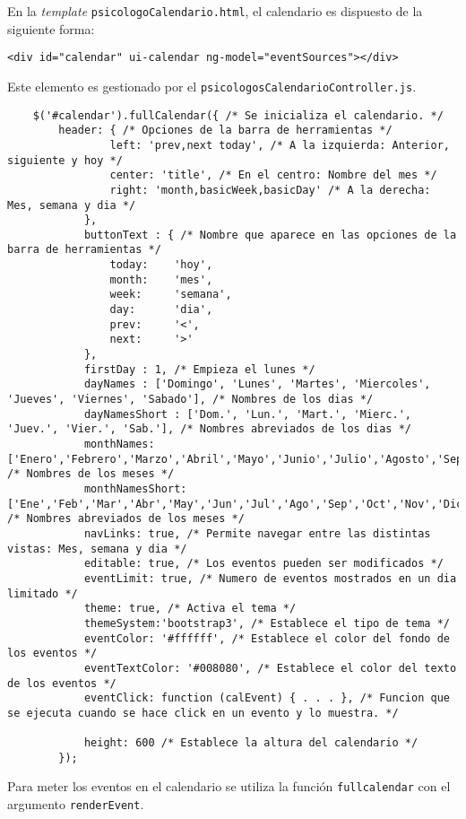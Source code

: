 En la \textit{template} \texttt{psicologoCalendario.html}, el calendario es dispuesto de la siguiente forma:


\medskip
\begin{lstlisting}
<div id="calendar" ui-calendar ng-model="eventSources"></div>
\end{lstlisting}


Este elemento es gestionado por el \texttt{psicologosCalendarioController.js}. 


\medskip
\begin{lstlisting}
	$('#calendar').fullCalendar({ /* Se inicializa el calendario. */
		header: { /* Opciones de la barra de herramientas */
				left: 'prev,next today', /* A la izquierda: Anterior, siguiente y hoy */
				center: 'title', /* En el centro: Nombre del mes */
				right: 'month,basicWeek,basicDay' /* A la derecha: Mes, semana y dia */
			},
			buttonText : { /* Nombre que aparece en las opciones de la barra de herramientas */
				today:    'hoy',
				month:    'mes',
				week:     'semana',
				day:      'dia',
				prev:	  '<',
				next:	  '>'
			},
			firstDay : 1, /* Empieza el lunes */
			dayNames : ['Domingo', 'Lunes', 'Martes', 'Miercoles', 'Jueves', 'Viernes', 'Sabado'], /* Nombres de los dias */
			dayNamesShort : ['Dom.', 'Lun.', 'Mart.', 'Mierc.', 'Juev.', 'Vier.', 'Sab.'], /* Nombres abreviados de los dias */
			monthNames: ['Enero','Febrero','Marzo','Abril','Mayo','Junio','Julio','Agosto','Septiembre','Octubre','Noviembre','Diciembre'], /* Nombres de los meses */
			monthNamesShort: ['Ene','Feb','Mar','Abr','May','Jun','Jul','Ago','Sep','Oct','Nov','Dic'], /* Nombres abreviados de los meses */
			navLinks: true, /* Permite navegar entre las distintas vistas: Mes, semana y dia */
			editable: true, /* Los eventos pueden ser modificados */
			eventLimit: true, /* Numero de eventos mostrados en un dia limitado */
			theme: true, /* Activa el tema */
			themeSystem:'bootstrap3', /* Establece el tipo de tema */
			eventColor: '#ffffff', /* Establece el color del fondo de los eventos */
			eventTextColor: '#008080', /* Establece el color del texto de los eventos */
			eventClick: function (calEvent) { . . . }, /* Funcion que se ejecuta cuando se hace click en un evento y lo muestra. */

			height: 600 /* Establece la altura del calendario */
		});
\end{lstlisting}


Para meter los eventos en el calendario se utiliza la función \texttt{fullcalendar} con el argumento \texttt{renderEvent}.



